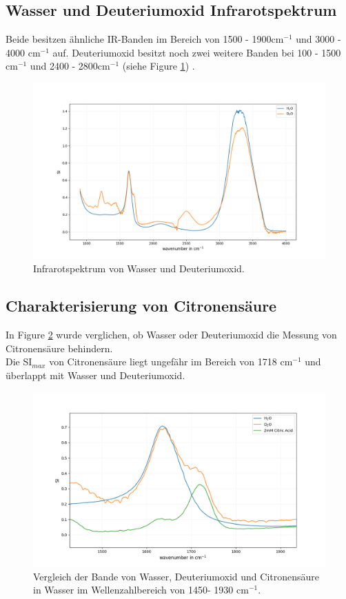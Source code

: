\documentclass[10pt,a4paper]{article}
\begin{document}
		\subsection{Wasser und Deuteriumoxid Infrarotspektrum}

			Beide besitzen ähnliche IR-Banden im Bereich von 1500 - 1900cm$^{-1}$ und 3000 - 4000  cm$^{-1}$  auf. Deuteriumoxid besitzt noch zwei weitere Banden bei 100 - 1500 cm$^{-1}$ und 2400 - 2800cm$^{-1}$ (siehe Figure \ref{fig:water}) .
		
			\begin{figure}[H]
				\centering
				\includegraphics[scale=0.55]{Onlywater.png}
				\caption{Infrarotspektrum von Wasser und Deuteriumoxid.}
				\label{fig:water}
			\end{figure}
		
	
		\subsection{Charakterisierung von Citronensäure}
			In Figure \ref{fig:water_citricacid} wurde verglichen, ob Wasser oder Deuteriumoxid die Messung von Citronensäure behindern.\\
			Die SI$_{max}$ von Citronensäure liegt ungefähr im Bereich von 1718 cm$^{-1}$ und überlappt mit Wasser und Deuteriumoxid.\\
		
			\begin{figure}[H]
				\centering
				\includegraphics[scale=0.60]{water_citricacid_upclose.png}
				\caption{Vergleich der Bande von Wasser, Deuteriumoxid und Citronensäure in Wasser im Wellenzahlbereich von 1450- 1930 cm$^{-1}$.}
				\label{fig:water_citricacid}
			\end{figure}
\end{document}
